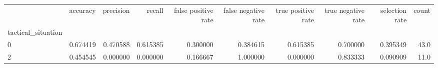 \begin{tabular}{lrrrrrrrrr}
\toprule
{} &  accuracy &  precision &    recall &  false positive rate &  false negative rate &  true positive rate &  true negative rate &  selection rate &  count \\
tactical\_situation &           &            &           &                      &                      &                     &                     &                 &        \\
\midrule
0                  &  0.674419 &   0.470588 &  0.615385 &             0.300000 &             0.384615 &            0.615385 &            0.700000 &        0.395349 &   43.0 \\
2                  &  0.454545 &   0.000000 &  0.000000 &             0.166667 &             1.000000 &            0.000000 &            0.833333 &        0.090909 &   11.0 \\
\bottomrule
\end{tabular}
